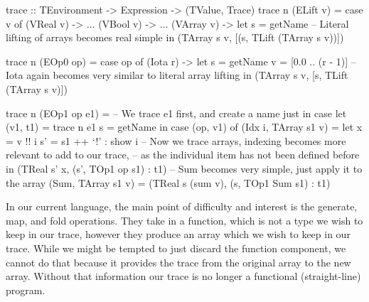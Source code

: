         \begin{haskell}[caption=Tracing whilst keeping arrays, label=lst:trace_array2, gobble=12]
            trace :: TEnvironment -> Expression -> (TValue, Trace)
            trace n (ELift v) =
                case v of
                    (VReal  v) -> $\ldots$
                    (VBool  v) -> $\ldots$
                    (VArray v) -> 
                        let s = getName
                        -- Literal lifting of arrays becomes real simple
                        in  (TArray s v, [(s, TLift (TArray s v))])

            trace n (EOp0 op) =
                case op of
                    (Iota r) ->
                        let s = getName
                            v = [0.0 .. (r - 1)]
                            -- Iota again becomes very similar to literal array lifting
                        in  (TArray s v, [s, TLift (TArray s v)])
            
            trace n (EOp1 op e1) =
                -- We trace e1 first, and create a name just in case
                let (v1, t1) = trace n e1
                    s = getName
                in  case (op, v1) of
                    (Idx i, TArray s1 v) =
                        let x  = v !! i
                            s' = s1 ++ `!' : show i
                        -- Now we trace arrays, indexing becomes more relevant to add to our trace,
                        -- as the individual item has not been defined before
                        in  (TReal s' x, (s', TOp1 op s1) : t1)
                    -- Sum becomes very simple, just apply it to the array
                    (Sum, TArray s1 v) = (TReal s (sum v), (s, TOp1 Sum s1) : t1)
        \end{haskell}

        In our current language, the main point of difficulty and interest is the generate, map, and fold operations.
        They take in a function, which is not a type we wish to keep in our trace, however they produce an array which we wish to keep in our trace.
        While we might be tempted to just discard the function component, we cannot do that because it provides the trace from the original array to the new array.
        Without that information our trace is no longer a functional (straight-line) program.

